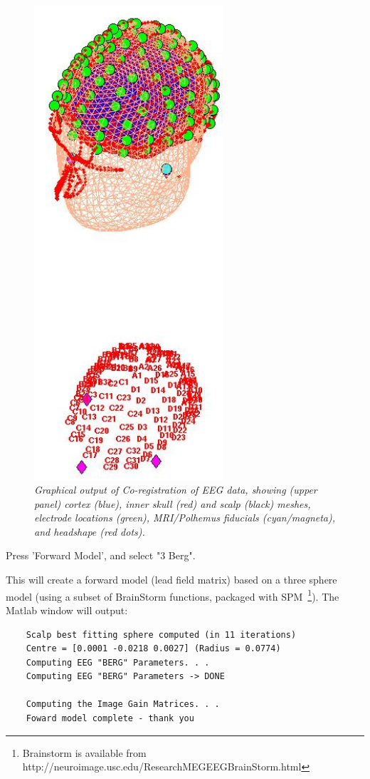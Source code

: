 \begin{figure}
\begin{center}
\includegraphics[width=70mm]{multimodal/figures/figure_32_8}
\caption{\em  Graphical output of Co-registration of EEG data, showing (upper panel) cortex (blue), inner skull (red) and scalp (black) meshes, electrode locations (green), MRI/Polhemus fiducials (cyan/magneta), and headshape (red dots).\label{fig_32_8}}
\end{center}
\end{figure}

\noindent * Press 'Forward Model', and select "3 {Berg}".

This will create a forward model (lead field matrix) based on a three sphere model (using a subset of BrainStorm functions, packaged with SPM~\footnote{Brainstorm is available from http://neuroimage.usc.edu/ResearchMEGEEGBrainStorm.html}). The Matlab window will output:
\begin{verbatim}
	Scalp best fitting sphere computed (in 11 iterations)
	Centre = [0.0001 -0.0218 0.0027] (Radius = 0.0774)
	Computing EEG "BERG" Parameters. . .
	Computing EEG "BERG" Parameters -> DONE

	Computing the Image Gain Matrices. . .
	Foward model complete - thank you
 \end{verbatim}

